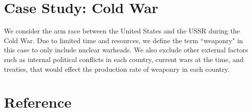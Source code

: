 \section{Case Study: Cold War}
We consider the arm race between the United States and the USSR during the Cold War. Due to limited time and resources, we define the term ``weaponry" in this case to only include nuclear warheads. We also exclude other external factors such as internal political conflicts in each country, current wars at the time, and treaties, that would effect the production rate of weaponry in each country.

\begin{thebibliography}{9}
\bibitem{}
\bibitem{}
\end{thebibliography}
\section{Reference}

